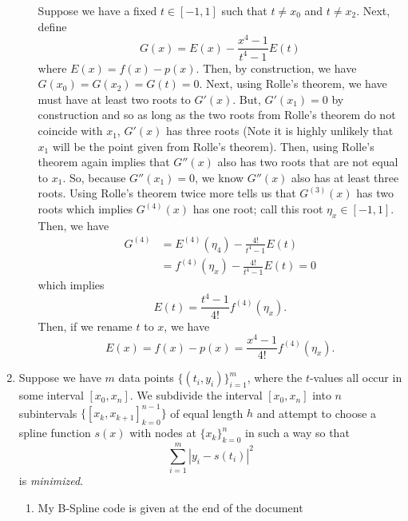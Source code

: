 \documentclass[a4paper,12pt]{article}
\newcommand{\abs}[1]{\left| #1 \right|}
\begin{document}
\begin{enumerate}[label = \arabic*.]
\begin{enumerate}[label = (\roman*)]
			Suppose we have a fixed $ t \in [-1,1] $ such that $ t \neq x_0 $ and $ t \neq x_2 $. Next, define
			\[
				G(x) = E(x) - \frac{x^4 - 1}{t^4 - 1} E(t)
			\]
			where $ E(x) = f(x) - p(x) $. Then, by construction, we have $ G(x_0) = G(x_2) = G(t) = 0 $. Next, using Rolle's theorem, we have must have at least two roots to $ G'(x) $. But, $ G'(x_1) = 0 $ by construction and so as long as the two roots from Rolle's theorem do not coincide with $ x_1 $, $ G'(x) $ has three roots (Note it is highly unlikely that $ x_1 $ will be the point given from Rolle's theorem). Then, using Rolle's theorem again implies that $ G''(x) $ also has two roots that are not equal to $ x_1 $. So, because $ G''(x_1) = 0 $, we know $ G''(x) $ also has at least three roots. Using Rolle's theorem twice more tells us that $ G^{(3)}(x) $ has two roots which implies $ G^{(4)}(x) $ has one root; call this root $ \eta_x \in [-1,1] $. Then, we have
			\begin{align*}
				G^{(4)} &= E^{(4)}(\eta_4) - \frac{4!}{t^4 - 1} E(t) \\
				&= f^{(4)}(\eta_x) - \frac{4!}{t^4 - 1} E(t) = 0
			\end{align*}
			which implies
			\[
				E(t) = \frac{t^4 - 1}{4!} f^{(4)}(\eta_x).
			\]
			Then, if we rename $ t $ to $ x $, we have
			\[
				E(x) = f(x) - p(x) = \frac{x^4 - 1}{4!} f^{(4)}(\eta_x).
			\]
			
		\end{enumerate}
	 \newpage
	\item Suppose we have $ m $ data points $ \{(t_i, y_i)\}_{i = 1}^m $, where the $ t $-values all occur in some interval $ [x_0, x_n] $. We subdivide the interval $ [x_0, x_n] $ into $ n $ subintervals $ \{[x_k, x_{k + 1}]_{k = 0}^{n - 1}\} $ of equal length $ h $ and attempt to choose a spline function $ s(x) $ with nodes at $ \{x_k\}_{k = 0}^n $ in such a way so that
	\[
		\sum_{i = 1}^{m} \abs{y_i - s(t_i)}^2
	\]
	is \emph{minimized}.
		\begin{enumerate}[label = (\roman*)]
			\item My B-Spline code is given at the end of the document
			

\end{enumerate}
\end{enumerate}
\end{document}
